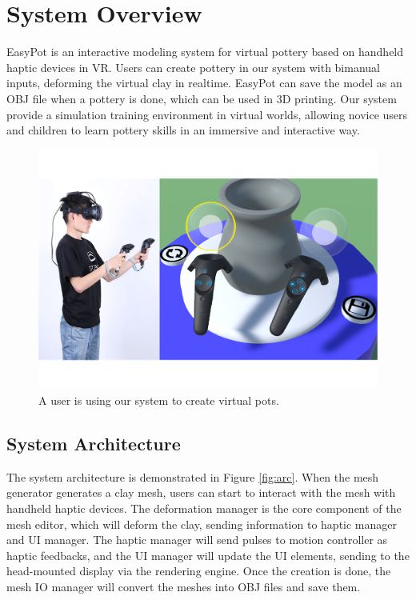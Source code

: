 \documentclass{svjour3}                     %
\begin{document}
\section{System Overview}
\label{sec:3}
EasyPot is an interactive modeling system for virtual pottery based on handheld haptic devices in VR.
Users can create pottery in our system with bimanual inputs, deforming the virtual clay in realtime.
EasyPot can save the model as an OBJ file when a pottery is done, which can be used in 3D printing.
Our system provide a simulation training environment in virtual worlds, allowing novice users and children to learn pottery skills in an immersive and interactive way.

\begin{figure}
\includegraphics[width=\textwidth]{results}
\caption{A user is using our system to create virtual pots.}
\label{fig:results}
\end{figure}

\subsection{System Architecture}
\label{sec:3.1}

The system architecture is demonstrated in Figure \ref{fig:arc}. When the mesh generator generates a clay mesh, users can start to interact with the mesh with handheld haptic devices. The deformation manager is the core component of the mesh editor, which will deform the clay, sending information to haptic manager and UI manager. The haptic manager will send pulses to motion controller as haptic feedbacks, and the UI manager will update the UI elements, sending to the head-mounted display via the rendering engine. Once the creation is done, the mesh IO manager will convert the meshes into OBJ files and save them.
\end{document}
